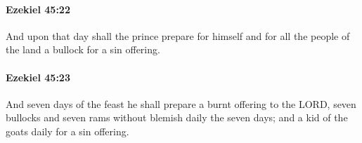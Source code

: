 		\paragraph{Ezekiel 45:22} %
			\label{EZEKIEL-45-22}

			And upon that day shall the prince prepare for himself and for all the people of the land a bullock for a sin offering.


		\paragraph{Ezekiel 45:23} %
			\label{EZEKIEL-45-23}

			And seven days of the feast he shall prepare a burnt offering to the LORD, seven bullocks and seven rams without blemish daily the seven days; and a kid of the goats daily for a sin offering.


